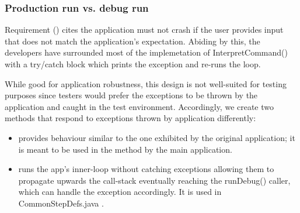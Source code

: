 \subsubsection{Production run vs. debug run}
\label{sec:}
Requirement (\RSeven) cites the application must not crash if the user provides input that does not match the application's expectation. Abiding by this, the developers have surrounded most of the implemetation of InterpretCommand() with a try/catch block which prints the exception and re-runs the loop. 
\par 
While good for application robustness, this design is not well-suited for testing purposes since testers would prefer the exceptions to be thrown by the application and caught in the test environment. Accordingly, we create two  methods that respond to exceptions thrown by application differently: 

\begin{itemize}
	\item {} provides behaviour similar to the one exhibited by the original application; it is meant to be used in the  method by the main application. 
	\item {} runs the app's inner-loop without catching exceptions allowing them to propagate upwards the call-stack eventually reaching the runDebug() caller, which can handle the exception accordingly. It is used in CommonStepDefs.java . 
\end{itemize}





